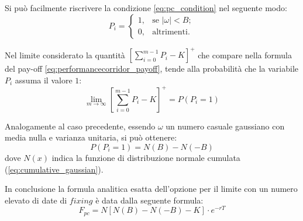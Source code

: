 Si può facilmente riscrivere la condizione \eqref{eq:pc_condition} nel seguente modo:
\begin{equation}
    P_i = \begin{cases}
    1, & \text{se} \,\,\left| \omega \right| < B;\\
    0, & \text{altrimenti}.
    \label{eq:condition_m}
  \end{cases}
\end{equation}

Nel limite considerato la quantità $\left[ \sum_{i=0}^{m-1}{P_i} - K \right]^+$ che compare nella formula del pay-off \eqref{eq:performancecorridor_payoff}, tende alla probabilità che la variabile $P_{i}$ assuma il valore $1$:
\begin{equation}
    \lim_{m \to \infty} \left[ \sum_{i=0}^{m-1}{P_i} - K \right]^+ = P\left(P_{i}=1\right)
\end{equation}

Analogamente al caso precedente, essendo $\omega$ un numero casuale gaussiano con media nulla e varianza unitaria, si può ottenere:
\begin{equation}
    P(P_{i}=1) = N(B) - N(-B)
\end{equation}
dove $N(x)$ indica la funzione di distribuzione normale cumulata (\ref{eq:cumulative_gaussian}).

In conclusione la formula analitica esatta dell'opzione per il limite con un numero elevato di date di $fixing$ è data dalla seguente formula:
\begin{equation}
    F_{pc}=N[N(B) - N(-B)-K]  \cdot e^{-rT}
\end{equation}